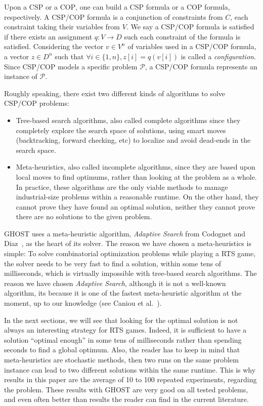 \documentclass[journal]{IEEEtran}
\newcommand{\csp}{\textsc{CSP}\xspace}
\newcommand{\cop}{\textsc{COP}\xspace}
\newcommand{\ghost}{\textsc{GHOST}\xspace}
\begin{document}
Upon a \csp or a \cop, one can build a \csp formula or a \cop formula,
respectively.   A \csp/\cop  formula is  a conjunction  of constraints
from $C$,  each constraint taking their  variables from $V$. We  say a
\csp/\cop formula  is satisfied  if there exists  an assignment  $q: V
\rightarrow  D$   such  each   constraint  of  the   formula  is
satisfied. Considering the  vector $v \in V^n$ of variables  used in a
\csp/\cop formula, a vector $z \in D^n$ such that
$\forall i \in \{1,n\}, z[i] = q(v[i])$ 
is called a {\it configuration}.  Since
\csp/\cop models a specific problem $\mathcal{P}$, a \csp/\cop formula
represents an instance of $\mathcal{P}$.

Roughly speaking,  there exist  two different  kinds of  algorithms to
solve \csp/\cop problems:
\begin{itemize}
\item Tree-based  search algorithms,  also called  complete algorithms
  since they completely  explore the search space  of solutions, using
  smart moves  (backtracking, forward  checking, etc) to  localize and
  avoid dead-ends in the search space.
\item Meta-heuristics,  also called incomplete algorithms,  since they
  are based upon local moves to  find optimums, rather than looking at
  the problem as  a whole. In practice, these algorithms  are the only
  viable  methods   to  manage   industrial-size  problems   within  a
  reasonable runtime. On  the other hand, they cannot  prove they have
  found an  optimal solution, neither  they cannot prove there  are no
  solutions to the given problem.
\end{itemize}

\ghost uses a  meta-heuristic algorithm,   \emph{Adaptive   Search}   from   Codognet   and
Diaz~\cite{Codognet01}, as the heart of   its   solver. 
The reason we have chosen a meta-heuristics is
simple: To solve combinatorial optimization problems while playing
a RTS  game, the  solver needs  to be  very fast  to find  a solution,
within some tens  of milliseconds, which is  virtually impossible with
tree-based search algorithms. The reason  we have chosen {\it Adaptive
  Search}, although it is  not a well-known algorithm, its because it is
one of the fastest meta-heuristic algorithm at  the moment, up to our knowledge
(see Caniou et al.~\cite{Caniou14}).

In  the next  sections,  we  will see  that  looking  for the  optimal
solution is not always an  interesting strategy for RTS games. Indeed,
it is sufficient to have a solution ``optimal enough'' in some tens of
milliseconds   rather  than   spending  seconds   to  find   a  global
optimum. Also, the reader has to keep in mind that meta-heuristics are
stochastic methods, then  two runs on the same  problem instance can lead
to  two different  solutions within  the  same runtime.   This is  why
results  in  this  paper  are  the  average  of  10  to  100  repeated
experiments,  regarding the  problem.  These  results with  \ghost are
very good on  all tested problems, and even often  better than results
the reader can find in the current literature.
\end{document}
